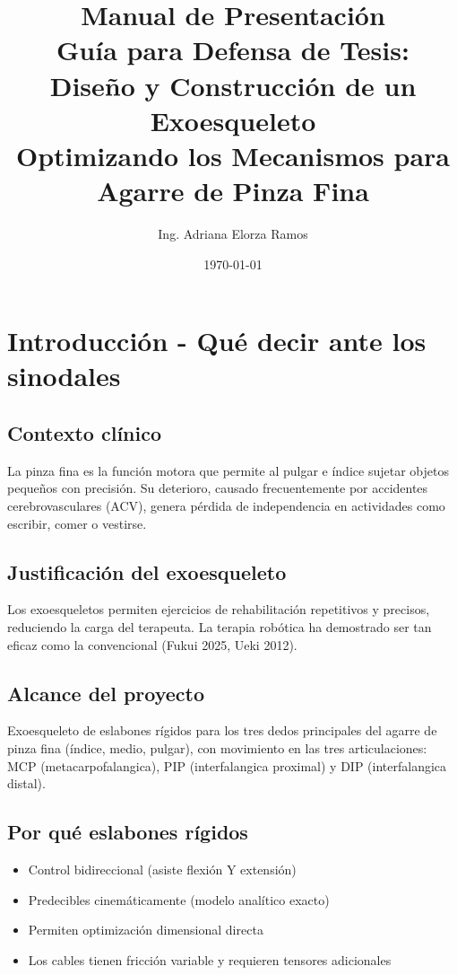 \documentclass[11pt,letterpaper]{article}
\title{Manual de Presentaci\'on\\Gu\'ia para Defensa de Tesis:\\Dise\~no y Construcci\'on de un Exoesqueleto\\Optimizando los Mecanismos para Agarre de Pinza Fina}
\author{Ing. Adriana Elorza Ramos}
\date{\today}
\begin{document}
\maketitle
\tableofcontents
\newpage

\section{Introducci\'on - Qu\'e decir ante los sinodales}

\subsection{Contexto cl\'inico}
La pinza fina es la funci\'on motora que permite al pulgar e \'indice sujetar objetos peque\~nos con precisi\'on. Su deterioro, causado frecuentemente por accidentes cerebrovasculares (ACV), genera p\'erdida de independencia en actividades como escribir, comer o vestirse.

\subsection{Justificaci\'on del exoesqueleto}
Los exoesqueletos permiten ejercicios de rehabilitaci\'on repetitivos y precisos, reduciendo la carga del terapeuta. La terapia rob\'otica ha demostrado ser tan eficaz como la convencional (Fukui 2025, Ueki 2012).

\subsection{Alcance del proyecto}
Exoesqueleto de eslabones r\'igidos para los tres dedos principales del agarre de pinza fina (\'indice, medio, pulgar), con movimiento en las tres articulaciones: MCP (metacarpofalangica), PIP (interfalangica proximal) y DIP (interfalangica distal).

\subsection{Por qu\'e eslabones r\'igidos}
\begin{itemize}
\item Control bidireccional (asiste flexi\'on Y extensi\'on)
\item Predecibles cinem\'aticamente (modelo anal\'itico exacto)
\item Permiten optimizaci\'on dimensional directa
\item Los cables tienen fricci\'on variable y requieren tensores adicionales
\end{itemize}
\end{document}
